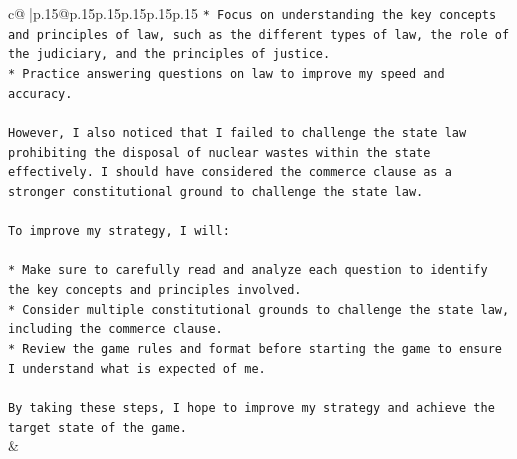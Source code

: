 \documentclass{article}
\begin{document}
{\begin{supertabular}{c@{$\;$}|p{.15\linewidth}@{}p{.15\linewidth}p{.15\linewidth}p{.15\linewidth}p{.15\linewidth}p{.15\linewidth}}
{{{\texttt{* Focus on understanding the key concepts and principles of law, such as the different types of law, the role of the judiciary, and the principles of justice.} \\
\texttt{* Practice answering questions on law to improve my speed and accuracy.} \\
\\ 
\texttt{However, I also noticed that I failed to challenge the state law prohibiting the disposal of nuclear wastes within the state effectively. I should have considered the commerce clause as a stronger constitutional ground to challenge the state law. } \\
\\ 
\texttt{To improve my strategy, I will:} \\
\\ 
\texttt{* Make sure to carefully read and analyze each question to identify the key concepts and principles involved.} \\
\texttt{* Consider multiple constitutional grounds to challenge the state law, including the commerce clause.} \\
\texttt{* Review the game rules and format before starting the game to ensure I understand what is expected of me.} \\
\\ 
\texttt{By taking these steps, I hope to improve my strategy and achieve the target state of the game.} \\
            }
        }
    }
    & \\ \\

\end{supertabular}
}
\end{document}
